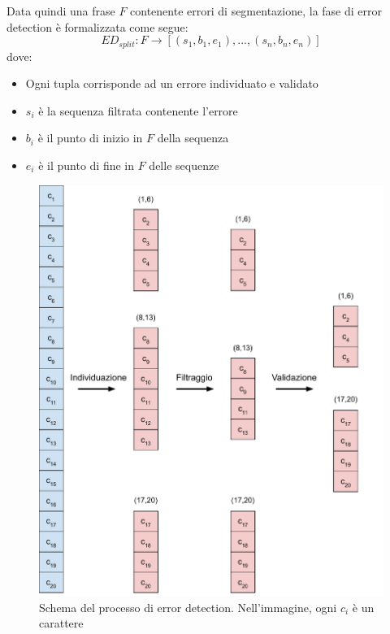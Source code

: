 Data quindi una frase $F$ contenente errori di segmentazione, la fase di error detection è formalizzata come segue:
\begin{equation}
\textit{ED}_{split}: F \rightarrow [(s_1,b_1,e_1),...,(s_n,b_n,e_n)]
\end{equation}
dove:
\begin{itemize}
\item Ogni tupla corrisponde ad un errore individuato e validato
\item $s_i$ è la sequenza filtrata contenente l'errore
\item $b_i$ è il punto di inizio in $F$ della sequenza
\item $e_i$ è il punto di fine in $F$ delle sequenze
\end{itemize}

\begin{figure}[H]
\centering
\includegraphics[width=\textwidth]{immagini/metodologia/split_error_detection}
\caption{Schema del processo di error detection. Nell'immagine, ogni $c_i$ è un carattere}
\label{fig:met_split_errdet}
\end{figure}


